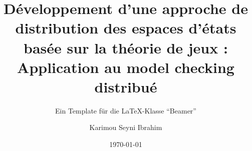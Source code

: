 
\newcommand{\presentationTitle}{Développement d'une approche de distribution des espaces d'états basée sur la théorie de jeux : \\Application au model checking distribué}
\newcommand{\shortTitle}{\textbf{Approche de distribution des espaces d'états basée sur la théorie de jeux}}
\newcommand{\presentationSubtitle}{Ein Template für die \LaTeX{}-Klasse \enquote{Beamer}}
\newcommand{\university}{Université Constantine 2}
\newcommand{\universityCourse}{IFA}
\newcommand{\universityDepartment}{Faculté des Nouvelles Technologies \\Département d’Informatique Fondamentale et\\ ses Applications}
\newcommand{\presentationKeywords}{\LaTeX, Beamer}
\newcommand{\presentationAuthor}{Karimou Seyni Ibrahim}
\newcommand{\presentationAuthorShort}{Karimou.S.I}
\newcommand{\presentationAuthorEmail}{ibrahim.karimouseyni@yahoo.com}
\newcommand{\presentationSubject}{Informatique}
\newcommand{\presentationLocation}{Leipzig}


\title[\shortTitle]{\presentationTitle{}}
\subtitle{\presentationSubtitle}
\author[\presentationAuthorShort]{\large \presentationAuthor}
 
\date{\today} 



